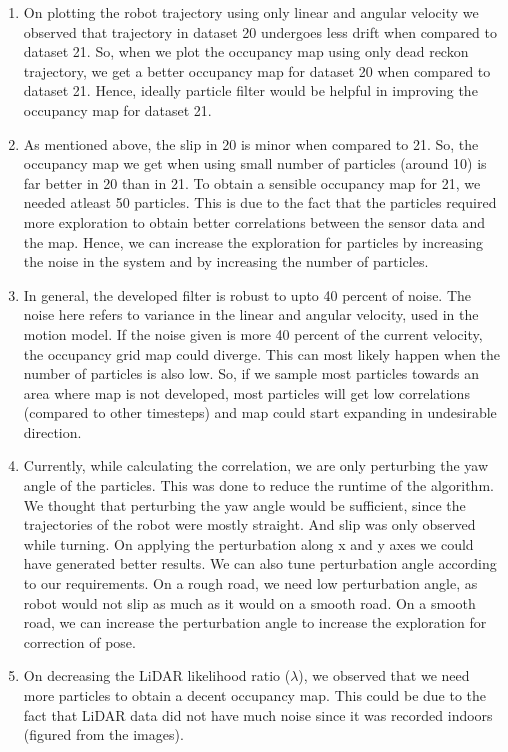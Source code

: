 \documentclass[a4paper]{article}
\begin{document}
\begin{enumerate}
    \item On plotting the robot trajectory using only linear and angular velocity we observed that trajectory in dataset 20 undergoes less drift when compared to dataset 21. So, when we plot the occupancy map using only dead reckon trajectory, we get a better occupancy map for dataset 20 when compared to dataset 21. Hence, ideally particle filter would be helpful in improving the occupancy map for dataset 21.
    \item As mentioned above, the slip in 20 is minor when compared to 21. So, the occupancy map we get when using small number of particles (around 10) is far better in 20 than in 21. To obtain a sensible occupancy map for 21, we needed atleast 50 particles. This is due to the fact that the particles required more exploration to obtain better correlations between the sensor data and the map. Hence, we can increase the exploration for particles by increasing the noise in the system and by increasing the number of particles.
    \item In general, the developed filter is robust to upto 40 percent of noise. The noise here refers to variance in the linear and angular velocity, used in the motion model. If the noise given is more 40 percent of the current velocity, the occupancy grid map could diverge. This can most likely happen when the number of particles is also low. So, if we sample most particles towards an area where map is not developed, most particles will get low correlations (compared to other timesteps) and map could start expanding in undesirable direction.
    \item Currently, while calculating the correlation, we are only perturbing the yaw angle of the particles. This was done to reduce the runtime of the algorithm. We thought that perturbing the yaw angle would be sufficient, since the trajectories of the robot were mostly straight. And slip was only observed while turning. On applying the perturbation along x and y axes we could have generated better results. We can also tune perturbation angle according to our requirements. On a rough road, we need low perturbation angle, as robot would not slip as much as it would on a smooth road. On a smooth road, we can increase the perturbation angle to increase the exploration for correction of pose.
    \item On decreasing the LiDAR likelihood ratio ($\lambda$), we observed that we need more particles to obtain a decent occupancy map. This could be due to the fact that LiDAR data did not have much noise since it was recorded indoors (figured from the images).

\end{enumerate}
\end{document}
